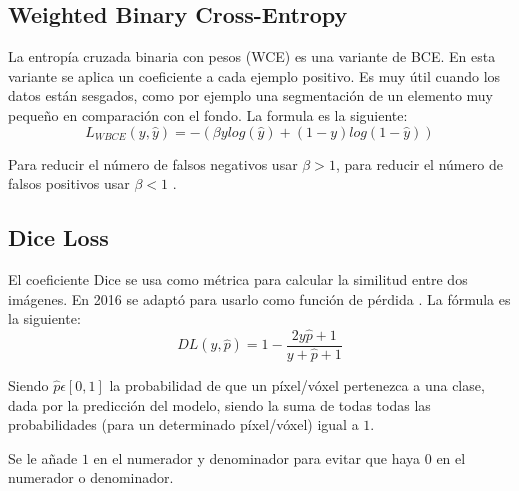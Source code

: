 \subsection{Weighted Binary Cross-Entropy}\label{cnn_wbce}

La entropía cruzada binaria con pesos (WCE) es una variante de BCE. En esta variante se aplica un coeficiente a cada ejemplo positivo. Es muy útil cuando los datos están sesgados, como por ejemplo una segmentación de un elemento muy pequeño en comparación con el fondo. La formula es la siguiente:
\begin{equation}
L_{WBCE}(y,\hat{y})=-(\beta y log(\hat{y}) + (1-y)log(1-\hat{y}))
\end{equation}

Para reducir el número de falsos negativos usar $\beta > 1$, para reducir el número de falsos positivos usar $\beta < 1$ \cite{Jadon2020}.

\subsection{Dice Loss}\label{cnn_dice}

El coeficiente Dice se usa como métrica para calcular la similitud entre dos imágenes. En 2016 se adaptó para usarlo como función de pérdida \cite{Cardoso2017}. La fórmula es la siguiente:
\begin{equation}
DL(y,\hat{p})= 1 - \frac{2y\hat{p}+1}{y+\hat{p}+1}
\end{equation}

Siendo $\hat{p}\epsilon[0,1]$ la probabilidad de que un píxel/vóxel pertenezca a una clase, dada por la predicción del modelo, siendo la suma de todas todas las probabilidades (para un determinado píxel/vóxel) igual a $1$.

Se le añade $1$ en el numerador y denominador para evitar que haya $0$ en el numerador o denominador.

